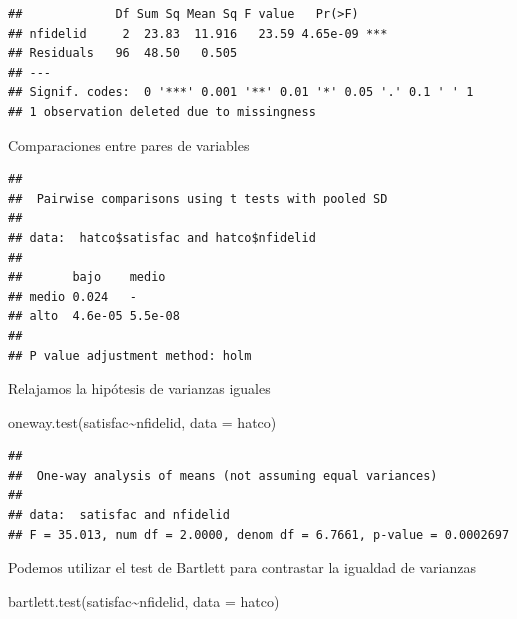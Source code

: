 \documentclass[
]{book}
\newenvironment{Shaded}{\begin{snugshade}}{\end{snugshade}}
\newcommand{\AttributeTok}[1]{\textcolor[rgb]{0.77,0.63,0.00}{#1}}
\newcommand{\FunctionTok}[1]{\textcolor[rgb]{0.00,0.00,0.00}{#1}}
\newcommand{\NormalTok}[1]{#1}
\newcommand{\SpecialCharTok}[1]{\textcolor[rgb]{0.00,0.00,0.00}{#1}}
\theoremstyle{break}
\theoremstyle{nonumberplain}
\begin{document}
\begin{verbatim}
##             Df Sum Sq Mean Sq F value   Pr(>F)    
## nfidelid     2  23.83  11.916   23.59 4.65e-09 ***
## Residuals   96  48.50   0.505                     
## ---
## Signif. codes:  0 '***' 0.001 '**' 0.01 '*' 0.05 '.' 0.1 ' ' 1
## 1 observation deleted due to missingness
\end{verbatim}

Comparaciones entre pares de variables

\begin{Shaded}
\end{Shaded}

\begin{verbatim}
## 
##  Pairwise comparisons using t tests with pooled SD 
## 
## data:  hatco$satisfac and hatco$nfidelid 
## 
##       bajo    medio  
## medio 0.024   -      
## alto  4.6e-05 5.5e-08
## 
## P value adjustment method: holm
\end{verbatim}

Relajamos la hipótesis de varianzas iguales

\begin{Shaded}
\begin{Highlighting}[]
\FunctionTok{oneway.test}\NormalTok{(satisfac}\SpecialCharTok{\textasciitilde{}}\NormalTok{nfidelid, }\AttributeTok{data =}\NormalTok{ hatco)}
\end{Highlighting}
\end{Shaded}

\begin{verbatim}
## 
##  One-way analysis of means (not assuming equal variances)
## 
## data:  satisfac and nfidelid
## F = 35.013, num df = 2.0000, denom df = 6.7661, p-value = 0.0002697
\end{verbatim}

Podemos utilizar el test de Bartlett para contrastar la igualdad de varianzas

\begin{Shaded}
\begin{Highlighting}[]
\FunctionTok{bartlett.test}\NormalTok{(satisfac}\SpecialCharTok{\textasciitilde{}}\NormalTok{nfidelid, }\AttributeTok{data =}\NormalTok{ hatco)}
\end{Highlighting}
\end{Shaded}
\end{document}
